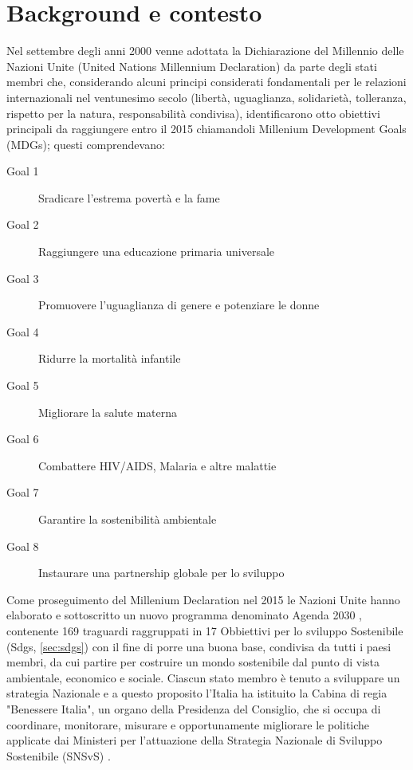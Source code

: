 \chapter{Background e contesto}
Nel settembre degli anni 2000 venne adottata la Dichiarazione del Millennio delle Nazioni Unite (United Nations Millennium Declaration) \cite{millennium_declaration} da parte degli stati membri che, considerando alcuni principi considerati fondamentali per le relazioni internazionali nel ventunesimo secolo (libertà, uguaglianza, solidarietà, tolleranza, rispetto per la natura, responsabilità condivisa), identificarono otto obiettivi principali da raggiungere entro il 2015 chiamandoli Millenium Development Goals (MDGs); questi comprendevano:
\begin{description}
    \item[Goal 1] Sradicare l'estrema povertà e la fame
    \item[Goal 2] Raggiungere una educazione primaria universale
    \item[Goal 3] Promuovere l'uguaglianza di genere e potenziare le donne
    \item[Goal 4] Ridurre la mortalità infantile
    \item[Goal 5] Migliorare la salute materna
    \item[Goal 6] Combattere HIV/AIDS, Malaria e altre malattie
    \item[Goal 7] Garantire la sostenibilità ambientale
    \item[Goal 8] Instaurare una partnership globale per lo sviluppo
\end{description}

Come proseguimento del Millenium Declaration nel 2015 le Nazioni Unite hanno elaborato e sottoscritto un nuovo programma denominato Agenda 2030 \cite{agenda2030}, contenente 169 traguardi raggruppati in 17 Obbiettivi per lo sviluppo Sostenibile (Sdgs, \ref{sec:sdgs}) con il fine di porre una buona base, condivisa da tutti i paesi membri, da cui partire per costruire un mondo sostenibile dal punto di vista ambientale, economico e sociale.
%
Ciascun stato membro è tenuto a sviluppare un strategia Nazionale e a questo proposito l'Italia ha istituito la Cabina di regia "Benessere Italia", un organo della Presidenza del Consiglio, che si occupa di coordinare, monitorare, misurare e opportunamente migliorare le politiche applicate dai Ministeri per l'attuazione della Strategia Nazionale di Sviluppo Sostenibile (SNSvS) \cite{SNSvS}.

